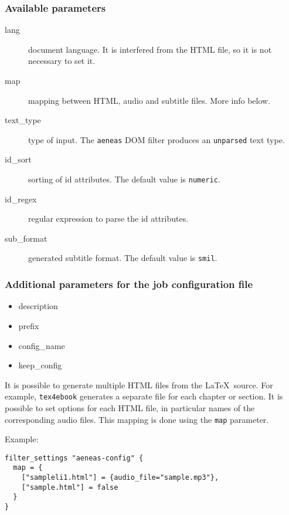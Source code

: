\hypertarget{available-parameters}{%
\subsubsection{Available parameters}\label{available-parameters}}

\begin{description}
\item[lang]
document language. It is interfered from the HTML file, so it is not
necessary to set it.
\item[map]
mapping between HTML, audio and subtitle files. More info below.
\item[text\_type]
type of input. The \texttt{aeneas} DOM filter produces an
\texttt{unparsed} text type.
\item[id\_sort]
sorting of id attributes. The default value is \texttt{numeric}.
\item[id\_regex]
regular expression to parse the id attributes.
\item[sub\_format]
generated subtitle format. The default value is \texttt{smil}.
\end{description}

\hypertarget{additional-parameters-for-the-job-configuration-file}{%
\subsubsection{Additional parameters for the job configuration
file}\label{additional-parameters-for-the-job-configuration-file}}

\begin{itemize}
\tightlist
\item
  description
\item
  prefix
\item
  config\_name
\item
  keep\_config
\end{itemize}

It is possible to generate multiple HTML files from the \LaTeX~source.
For example, \texttt{tex4ebook} generates a separate file for each
chapter or section. It is possible to set options for each HTML file, in
particular names of the corresponding audio files. This mapping is done
using the \texttt{map} parameter.

Example:

\begin{verbatim}
filter_settings "aeneas-config" {
  map = {
    ["sampleli1.html"] = {audio_file="sample.mp3"}, 
    ["sample.html"] = false
  }
}
\end{verbatim}

